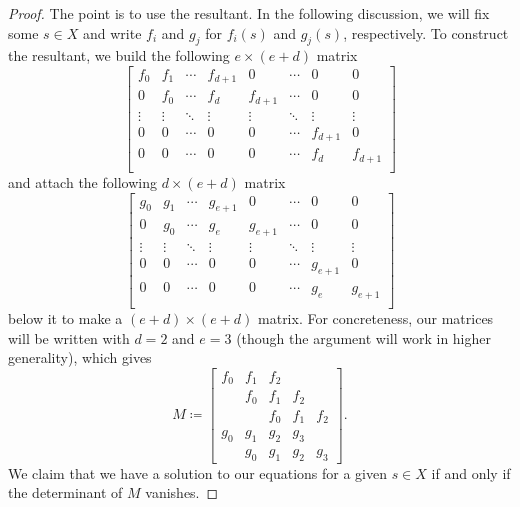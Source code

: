 \begin{proof}
	The point is to use the resultant. In the following discussion, we will fix some $s\in X$ and write $f_i$ and $g_j$ for $f_i(s)$ and $g_j(s)$, respectively. To construct the resultant, we build the following $e\times(e+d)$ matrix
	\[\begin{bmatrix}
		f_0 & f_1 & \cdots & f_{d+1} & 0 & \cdots & 0 & 0 \\
		0 & f_0 & \cdots & f_d & f_{d+1} & \cdots & 0 & 0\\
		\vdots & \vdots & \ddots & \vdots & \vdots & \ddots & \vdots & \vdots \\
		0 & 0 & \cdots & 0 & 0 & \cdots & f_{d+1} & 0 \\
		0 & 0 & \cdots & 0 & 0 & \cdots & f_d & f_{d+1} \\
	\end{bmatrix}\]
	and attach the following $d\times(e+d)$ matrix
	\[\begin{bmatrix}
		g_0 & g_1 & \cdots & g_{e+1} & 0 & \cdots & 0 & 0 \\
		0 & g_0 & \cdots & g_e & g_{e+1} & \cdots & 0 & 0\\
		\vdots & \vdots & \ddots & \vdots & \vdots & \ddots & \vdots & \vdots \\
		0 & 0 & \cdots & 0 & 0 & \cdots & g_{e+1} & 0 \\
		0 & 0 & \cdots & 0 & 0 & \cdots & g_e & g_{e+1} \\
	\end{bmatrix}\]
	below it to make a $(e+d)\times(e+d)$ matrix. For concreteness, our matrices will be written with $d=2$ and $e=3$ (though the argument will work in higher generality), which gives
	\[M\coloneqq\begin{bmatrix}
		f_0 & f_1 & f_2 \\
		    & f_0 & f_1 & f_2 \\
			&     & f_0 & f_1 & f_2 \\
		g_0 & g_1 & g_2 & g_3 \\
		    & g_0 & g_1 & g_2 & g_3
	\end{bmatrix}.\]
	We claim that we have a solution to our equations for a given $s\in X$ if and only if the determinant of $M$ vanishes.


\end{proof}
